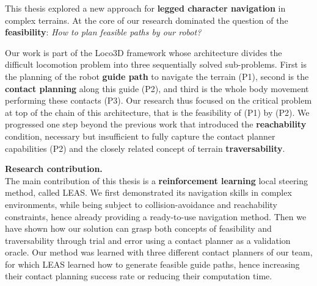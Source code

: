 

This thesis explored a new approach for \textbf{legged character navigation} in complex terrains. At the core of our research dominated the question of the \textbf{feasibility}: \textit{How to plan feasible paths by our robot?}

Our work is part of the Loco3D framework whose architecture divides the difficult locomotion problem into three sequentially solved sub-problems. First is the planning of the robot \textbf{guide path} to navigate the terrain (P1), second is the \textbf{contact planning} along this guide (P2), and third is the whole body movement performing these contacts (P3).
Our research thus focused on the critical problem at top of the chain of this architecture, that is the feasibility of (P1) by (P2).
We progressed one step beyond the previous work \cite{RB-PRM} that introduced the \textbf{reachability} condition, necessary but insufficient to fully capture the contact planner capabilities (P2) and the closely related concept of terrain \textbf{traversability}.

\hfill \break

\noindent\textbf{Research contribution.}\\

The main contribution of this thesis is a \textbf{reinforcement learning} local steering method, called LEAS. We first demonstrated its navigation skills in complex environments, while being subject to collision-avoidance and reachability constraints, hence already providing a ready-to-use navigation method.
Then we have shown how our solution can grasp both concepts of feasibility and traversability through trial and error using a contact planner as a validation oracle.
Our method was learned with three different contact planners of our team, for which LEAS learned how to generate feasible guide paths, hence increasing their contact planning success rate or reducing their computation time.



